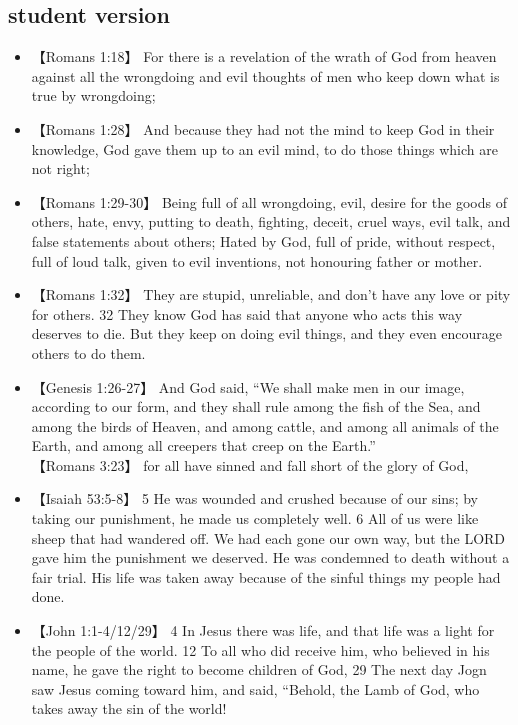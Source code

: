\newpage
\subsection{student version}
\begin{itemize}
\item 【Romans 1:18】 For there is a revelation of the wrath of God from heaven against all the wrongdoing and evil thoughts of men who keep down what is true by wrongdoing;\\


\item 【Romans 1:28】 And because they had not the mind to keep God in their knowledge, God gave them up to an evil mind, to do those things which are not right;\\


\item 【Romans 1:29-30】 Being full of all wrongdoing, evil, desire for the goods of others, hate, envy, putting to death, fighting, deceit, cruel ways, evil talk, and false statements about others;
Hated by God, full of pride, without respect, full of loud talk, given to evil inventions, not honouring father or mother.\\



\item 【Romans 1:32】 They are stupid, unreliable, and don't have any love or pity for others. 32 They know God has said that anyone who acts this way deserves to die. But they keep on doing evil things, and they even encourage others to do them.\\


\item 【Genesis 1:26-27】 And God said, “We shall make men in our image, according to our form, and they shall rule among the fish of the Sea, and among the birds of Heaven, and among cattle, and among all animals of the Earth, and among all creepers that creep on the Earth.”\\
【Romans 3:23】 for all have sinned and fall short of the glory of God, \\

\item 【Isaiah 53:5-8】 5 He was wounded and crushed because of our sins; by taking our punishment, he made us completely well. 6 All of us were like sheep that had wandered off.  We had each gone our own way, but the LORD gave him the punishment we deserved. He was condemned to death without a fair trial. His life was taken away because of the sinful things my people had done.


\item 【John 1:1-4/12/29】  4 In Jesus there was life, and that life was a light for the people of the world. 12 To all who did receive him, who believed in his name, he gave the right to become children of God, 29 The next day Jogn saw Jesus coming toward him, and said, “Behold, the Lamb of God, who takes away the sin of the world!

\end{itemize}



